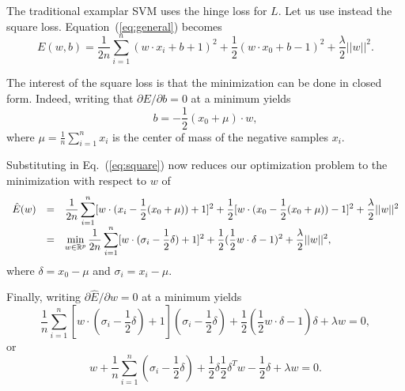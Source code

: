 \documentclass[12pt,letterpaper]{article}
\begin{document}
The traditional examplar SVM uses the hinge loss for $L$. Let us use
instead the square loss. Equation~(\ref{eq:general}) becomes
\begin{equation}
E(w,b)=\frac{1}{2n}\sum_{i=1}^n (w\cdot x_i+b+1)^2+ \frac{1}{2}(w\cdot
x_0+b-1)^2+\frac{\lambda}{2} ||w||^2.
\label{eq:square}
\end{equation}
 
The interest of the square loss is that the minimization can be done
in closed form. Indeed, writing that $\partial E/\partial b=0$ at a
minimum yields
\begin{equation}
b=-\frac{1}{2}(x_0+\mu)\cdot w,
\end{equation}
where $\mu=\frac{1}{n}\sum_{i=1}^n x_i$ is the center of mass of the
negative samples $x_i$.
 
Substituting in Eq.~(\ref{eq:square}) now reduces our optimization problem
to the minimization with respect to $w$ of
\begin{equation}
\begin{array}{lcl}\hat{E}(w)&=&
\displaystyle\frac{1}{2n}\sum_{i=1}^n [w\cdot (x_i-\frac{1}{2}(x_0+\mu))+1]^2
+\frac{1}{2}[w\cdot (x_0-\frac{1}{2}(x_0+\mu))-1]^2+\frac{\lambda}{2}||w||^2\\
&=&
\displaystyle\min_{w\in\mathbb{R}^p}
\frac{1}{2n}\sum_{i=1}^n [w\cdot (\sigma_i-\frac{1}{2}\delta) +1]^2
+\frac{1}{2}(\frac{1}{2}w\cdot\delta-1)^2+\frac{\lambda}{2}||w||^2,
\end{array}
\label{eq:weq}
\end{equation}
where $\delta=x_0-\mu$ and $\sigma_i=x_i-\mu$.
 
Finally, writing $\partial\hat{E}/\partial w=0$ at a minimum yields
\begin{equation}
\frac{1}{n}\sum_{i=1}^n [w\cdot(\sigma_i-\frac{1}{2}\delta)+1](\sigma_i-\frac{1}{2}\delta)
+\frac{1}{2}(\frac{1}{2}w\cdot\delta-1)\delta +\lambda w=0,
\end{equation}
or
\begin{equation}
[\frac{1}{n}\sum_{i=1}^n(\sigma_i-\frac{1}{2}\delta)(\sigma_i^T-\frac{1}{2}\delta^T)] w
+\frac{1}{n}\sum_{i=1}^n (\sigma_i-\frac{1}{2}\delta) +\frac{1}{2}\delta\frac{1}{2}\delta^T w -\frac{1}{2}\delta +\lambda w
=0.
\end{equation}
 
\end{document}
